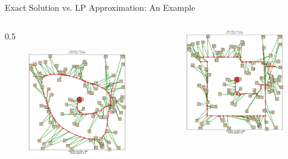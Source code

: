 \documentclass{beamer}
\begin{document}
\begin{frame}[t]{Exact Solution vs. LP Approximation: An Example}
  \begin{columns}
    \begin{column} {0.5\textwidth}
      \begin{figure}
        \includegraphics[width=6.0cm]{../img/Greedy_SLSQP.pdf}
      \end{figure}
    \end{column}

    \begin{column}{0.5\textwidth}
       \begin{figure}
        \includegraphics[width=6.0cm]{../img/Greedy_LP.pdf}
      \end{figure}
     \end{column}
   \end{columns}
\end{frame}

\end{document}
